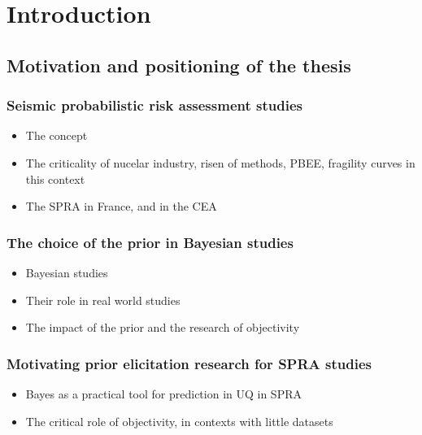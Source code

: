 

\chapter{Introduction}




\section{Motivation and positioning of the thesis}

\subsection{Seismic probabilistic risk assessment studies}

\begin{itemize}
    \item The concept
    \item The criticality of nucelar industry, risen of methods, PBEE, fragility curves in this context
    \item The SPRA in France, and in the CEA
\end{itemize}


\subsection{The choice of the prior in Bayesian studies}

\begin{itemize}
    \item Bayesian studies
    \item Their role in real world studies
    \item The impact of the prior and the research of objectivity
\end{itemize}


\subsection{Motivating prior elicitation research for SPRA studies}

\begin{itemize}
    \item Bayes as a practical tool for prediction in UQ in SPRA
    \item The critical role of objectivity, in contexts with little datasets
\end{itemize}



